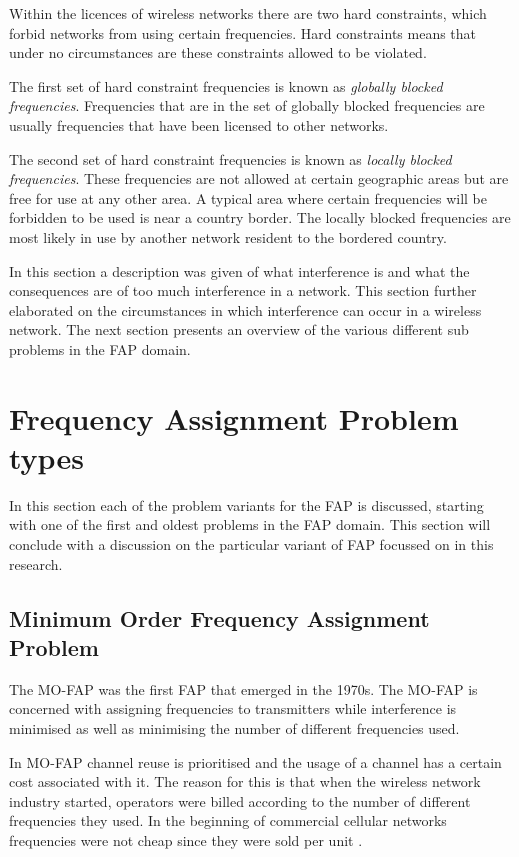 Within the licences of wireless networks there are two hard constraints, which forbid networks from using certain frequencies. Hard constraints means that under no circumstances are these constraints allowed to be violated.

The first set of hard constraint frequencies is known as \emph{globally blocked frequencies}. Frequencies that are in the set of globally blocked frequencies are usually frequencies that have been licensed to other networks\cite{Karen2004,InterferenceOrientatedFAP}.

The second set of hard constraint frequencies is known as \emph{locally blocked frequencies}. These frequencies are not allowed at certain geographic areas but are free for use at any other area\cite{InterferenceOrientatedFAP}. A typical area where certain frequencies will be forbidden to be used is near a country border\cite{InterferenceOrientatedFAP}. The locally blocked frequencies are most likely in use by another network resident to the bordered country.

In this section a description was given of what interference is and what the consequences are of too much interference in a network. This section further elaborated on the circumstances in which interference can occur in a wireless network. The next section presents an overview of the various different sub problems in the \gls{FAP} domain.


\section{Frequency Assignment Problem types}
\label{sec:FAPVariants}
In this section each of the problem variants for the \gls{FAP} is discussed, starting with one of the first and oldest problems in the \gls{FAP} domain. This section will conclude with a discussion on the particular variant of \gls{FAP} focussed on in this research.
\subsection{Minimum Order Frequency Assignment Problem}
The \gls{MO-FAP} was the first \gls{FAP} that emerged in the 1970s. The \gls{MO-FAP} is concerned with assigning frequencies to transmitters while interference is minimised as well as minimising the number of different frequencies used\cite{Karen2004}. 

In \gls{MO-FAP} channel reuse is prioritised and the usage of a channel has a certain cost associated with it. The reason for this is that when the wireless network industry started, operators were billed according to the number of different frequencies they used. In the beginning of commercial cellular networks frequencies were not cheap since they were sold per unit \cite{MontemanniThesis}. 

